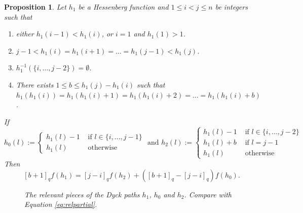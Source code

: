 \documentclass[10pt]{amsart}
\newtheorem{Prop}[Lem]{Proposition}
\theoremstyle{definition}
\newcommand{\dyckpath}[2]{
\draw[line width=2pt] (#1) foreach \dir in {#2}{ -- ++(\dir*90:1)};
}
\begin{document}
\begin{Prop}
\label{prop:relations}
Let $h_1$ be a Hessenberg function and $1\leq i<j\leq n$ be integers such that
\begin{enumerate}
    \item\label{item:cond1} either $h_1(i-1)<h_1(i)$, or $i=1$ and $h_1(1)>1$.
    \item\label{item:cond2} $j-1<h_1(i)=h_1(i+1)=\ldots=h_1(j-1)<h_1(j)$.
    \item\label{item:cond3} $h_1^{-1}(\{i,\ldots, j-2\})=\emptyset$.
    \item\label{item:cond4} There exists $1\leq b\leq h_1(j)-h_1(i)$ such that $h_1(h_1(i))=h_1(h_1(i)+1)=h_1(h_1(i)+2)=\ldots=h_1(h_1(i)+b)$.
\end{enumerate}
If
\[
h_0(l):=\begin{cases}
h_1(l)-1 &\text{ if }l\in \{i,\ldots, j-1\}\\
h_1(l)& \text{ otherwise}
\end{cases}
\text{ and }
h_2(l):=\begin{cases}
h_1(l)-1 &\text{ if }l\in \{i,\ldots, j-2\}\\
h_1(l)+b & \text{ if }l=j-1\\
h_1(l)&\text{ otherwise}
\end{cases}
\]
Then
\begin{equation}
    \label{eq:proprelations}
[b+1]_qf(h_1)=[j-i]_qf(h_2)+([b+1]_q-[j-i]_q)f(h_0).
\end{equation}
\begin{figure}[htb]  \centering
{}
\caption{The relevant pieces of the Dyck paths $h_1$, $h_0$ and $h_2$. Compare with Equation \eqref{eq:relpartial}.}
\label{fig:h0h2}
\end{figure}
\end{Prop}
\end{document}
